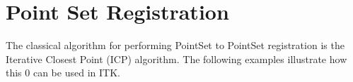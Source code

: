 \section{Point Set Registration}
\label{sec:PointSetRegistration}

The classical algorithm for performing PointSet to PointSet registration is the
Iterative Closest Point (ICP) algorithm.  The following examples illustrate how
this 0 can be used in ITK.

\ifitkFullVersion

\fi

\ifitkFullVersion

\fi

\ifitkFullVersion

\fi


